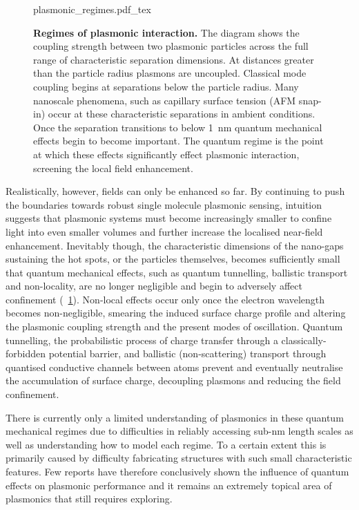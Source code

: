 \documentclass[12pt, a4paper, twoside]{book}
\begin{document}
\begin{figure}[bt]
\centering
\fontsize{10pt}{1em}\selectfont
{plasmonic_regimes.pdf_tex}
\caption[Regimes of plasmonic interaction.]{\textbf{Regimes of plasmonic interaction.} The diagram shows the coupling strength between two plasmonic particles across the full range of characteristic separation dimensions. At distances greater than the particle radius plasmons are uncoupled. Classical mode coupling begins at separations below the particle radius. Many nanoscale phenomena, such as capillary surface tension (AFM snap-in) occur at these characteristic separations in ambient conditions. Once the separation transitions to below \SI{1}{nm} quantum mechanical effects begin to become important. The quantum regime is the point at which these effects significantly effect plasmonic interaction, screening the local field enhancement.}
\label{fig:plasmonic_regimes}
\vspace{-10pt}
\end{figure}

Realistically, however, fields can only be enhanced so far. By continuing to push the boundaries towards robust single molecule plasmonic sensing, intuition suggests that plasmonic systems must become increasingly smaller to confine light into even smaller volumes and further increase the localised near-field enhancement. Inevitably though, the characteristic dimensions of the nano-gaps sustaining the hot spots, or the particles themselves, becomes sufficiently small that quantum mechanical effects, such as quantum tunnelling, ballistic transport and non-locality, are no longer negligible and begin to adversely affect confinement (\figurename~\ref{fig:plasmonic_regimes}).
Non-local effects occur only once the electron wavelength becomes non-negligible, smearing the induced surface charge profile and altering the plasmonic coupling strength and the present modes of oscillation.
Quantum tunnelling, the probabilistic process of charge transfer through a classically-forbidden potential barrier, and ballistic (non-scattering) transport through quantised conductive channels between atoms prevent and eventually neutralise the accumulation of surface charge, decoupling plasmons and reducing the field confinement.

There is currently only a limited understanding of plasmonics in these quantum mechanical regimes due to difficulties in reliably accessing sub-nm length scales as well as understanding how to model each regime. To a certain extent this is primarily caused by difficulty fabricating structures with such small characteristic features. Few reports have therefore conclusively shown the influence of quantum effects on plasmonic performance and it remains an extremely topical area of plasmonics that still requires exploring.
\end{document}
